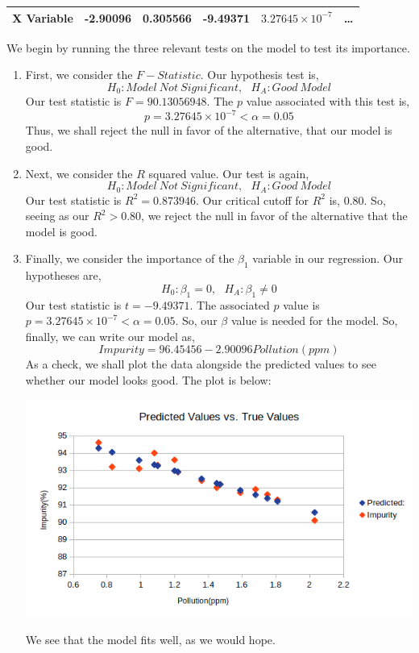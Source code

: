 \documentclass[letterpaper,10pt]{article}
\begin{document}
\begin{enumerate}
\begin{center}
\begin{tabular}{rrrrrr}
X Variable & -2.90096 & 0.305566 & -9.49371 & $3.27645\times10^{-7}$ & \ldots \\\hline
\end{tabular}
\end{center}
We begin by running the three relevant tests on the model to test its importance.
\begin{enumerate}
\item First, we consider the $F-Statistic$. Our hypothesis test is,
\[H_0: Model\ Not\ Significant,\ \ \ H_A: Good\ Model\]
Our test statistic is $F=90.13056948$. The $p$ value associated with this test is,
\[p=3.27645\times10^{-7}<\alpha=0.05\]
Thus, we shall reject the null in favor of the alternative, that our model is good.
\item Next, we consider the $R$ squared value. Our test is again,
\[H_0: Model\ Not\ Significant,\ \ \ H_A: Good\ Model\]
Our test statistic is $R^2=0.873946$. Our critical cutoff for $R^2$ is, $0.80$. So, seeing as our $R^2>0.80$, we reject the null in favor of the alternative that the model is good.
\item Finally, we consider the importance of the $\beta_1$ variable in our regression. Our hypotheses are,
\[H_0: \beta_1=0,\ \ \ H_A: \beta_1\neq 0\]
Our test statistic is $t=-9.49371$. The associated $p$ value is $p=3.27645\times10^{-7}<\alpha=0.05$. So, our $\beta$ value is needed for the model. So, finally, we can write our model as,
\[Impurity=96.45456-2.90096Pollution(ppm)\]
As a check, we shall plot the data alongside the predicted values to see whether our model looks good. The plot is below:
\begin{center}
\includegraphics[scale=0.75]{9pred.png}
\end{center}
We see that the model fits well, as we would hope.
\end{enumerate}
\end{enumerate}
\end{document}
